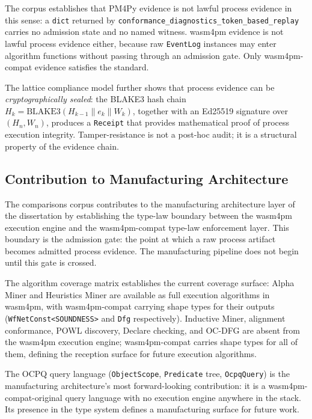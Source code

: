 The corpus establishes that PM4Py evidence is not lawful process evidence in this
sense: a \texttt{dict} returned by \texttt{conformance\_diagnostics\_token\_based\_replay}
carries no admission state and no named witness. wasm4pm evidence is not lawful
process evidence either, because raw \texttt{EventLog} instances may enter
algorithm functions without passing through an admission gate. Only wasm4pm-compat
evidence satisfies the standard.

The lattice compliance model further shows that process evidence can be
\emph{cryptographically sealed}: the BLAKE3 hash chain $H_k =
\text{BLAKE3}(H_{k-1} \| e_k \| W_k)$, together with an Ed25519 signature over
$(H_n, W_n)$, produces a \texttt{Receipt} that provides mathematical proof of
process execution integrity. Tamper-resistance is not a post-hoc audit; it is
a structural property of the evidence chain.

\subsection{Contribution to Manufacturing Architecture}
\label{sec:comparisons-contribution-manufacturing}

The comparisons corpus contributes to the manufacturing architecture layer of the
dissertation by establishing the type-law boundary between the wasm4pm execution
engine and the wasm4pm-compat type-law enforcement layer. This boundary is the
admission gate: the point at which a raw process artifact becomes admitted process
evidence. The manufacturing pipeline does not begin until this gate is crossed.

The algorithm coverage matrix establishes the current coverage surface:
Alpha Miner and Heuristics Miner are available as full execution algorithms in
wasm4pm, with wasm4pm-compat carrying shape types for their outputs
(\texttt{WfNetConst<SOUNDNESS>} and \texttt{Dfg} respectively). Inductive Miner,
alignment conformance, POWL discovery, Declare checking, and OC-DFG are absent
from the wasm4pm execution engine; wasm4pm-compat carries shape types for all of
them, defining the reception surface for future execution algorithms.

The OCPQ query language (\texttt{ObjectScope}, \texttt{Predicate} tree,
\texttt{OcpqQuery}) is the manufacturing architecture's most forward-looking
contribution: it is a wasm4pm-compat-original query language with no execution
engine anywhere in the stack. Its presence in the type system defines a
manufacturing surface for future work.

